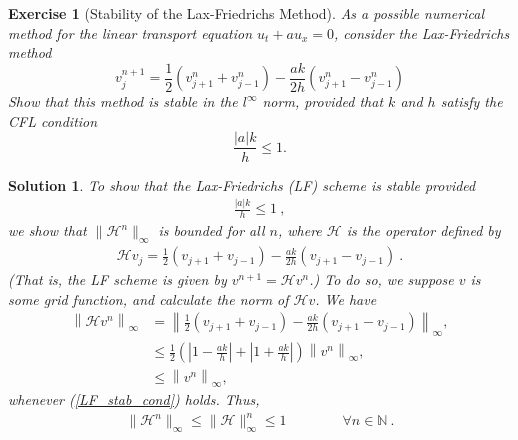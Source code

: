 \documentclass[10pt,letterpaper]{article}
\newcommand{\rb}[1]{ \left(  {#1} \right) }
\newcommand{\norm}[1]{ \left\|  {#1} \right\| }
\theoremstyle{break}
\newtheorem{exercise}{Exercise}
\newtheorem{mysolution}{Solution}
\newenvironment{solution}{\begin{mysolution}}{\end{mysolution}}
\begin{document}
\begin{exercise}[Stability of the Lax-Friedrichs Method]
	As a possible numerical method for the linear transport equation $u_t+au_x=0$, consider the Lax-Friedrichs method
	\begin{equation}
		v_{j}^{n+1}=\frac{1}{2}(v_{j+1}^{n}+v_{j-1}^{n})-\frac{ak}{2h}(v_{j+1}^{n}-v_{j-1}^{n})
	\end{equation}
	Show that this method is stable in the $l^\infty$ norm, provided that $k$ and $h$ satisfy the \textit{CFL condition}
	\begin{equation}
		\frac{|a|k}{h}\leq1.
	\end{equation}
\end{exercise}

\begin{solution}
	To show that the Lax-Friedrichs (LF) scheme is stable provided 
    \begin{gather} \label{LF_stab_cond}
        \frac{|a|k}{h}\le 1\ , 
    \end{gather} 
    we show that $\|\mathcal{H}^n\|_\infty$ is bounded for all $n$, where $\mathcal{H}$ is the operator defined by
    \begin{gather}
        \mathcal{H} v_j=\frac{1}{2}\rb{v_{j+1}+v_{j-1}} -\frac{ak}{2h}\rb{v_{j+1}-v_{j-1}}\ .
    \end{gather}
    (That is, the LF scheme is given by $v^{n+1}=\mathcal{H} v^n$.)
    To do so, we suppose $v$ is some grid function, and calculate the norm of $\mathcal{H} v$.
    We have
    \begin{align}	
        \norm{\mathcal{H} v^n}_\infty 
        &
        =
        \norm{
            \frac{1}{2} ( v_{j+1} +v_{j-1} ) 
            -
            \frac{ak}{2h} ( v_{j+1} -v_{j-1} )
        }_\infty, 
        \\
        &\le
        \frac{1}{2}
        \rb{ 
            | 1-\frac{ak}{h} |
            +
            | 1+\frac{ak}{h} |
        }
        \norm{v^n}_\infty,
        \\
        &\le
        \norm{v^n}_\infty,	 
    \end{align}
    whenever (\ref{LF_stab_cond}) holds. Thus, 
    \begin{gather} 	
        \|\mathcal{H}^n\|_\infty \le \|\mathcal{H}\|_\infty^n \le1
        \qquad\qquad \forall n\in \mathbb{N}\ . 
    \end{gather}


\end{solution}
\end{document}
